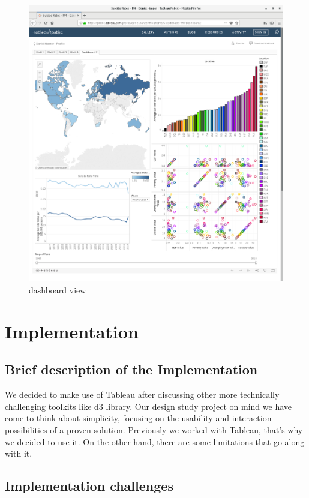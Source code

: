 \documentclass{vgtc}                          %
\begin{document}
\begin{figure}[tb]
\centering
\includegraphics[width=\columnwidth]{image/roman/tableau.png}
\caption{dashboard view}
\label{fig:dash} 
\end{figure}

\section{Implementation}

\subsection{Brief description of the Implementation}

We decided to make use of Tableau after discussing other more technically challenging toolkits like d3 library. Our design study project on mind we have come to think about simplicity, focusing on the usability and interaction possibilities of a proven solution. Previously we worked with Tableau, that's why we decided to use it. On the other hand, there are some limitations that go along with it. 


\subsection{Implementation challenges}
\end{document}
